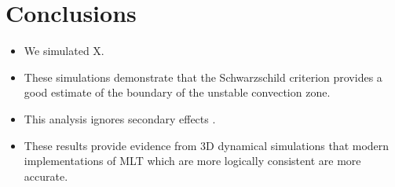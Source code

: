 \section{Conclusions}
\label{sec:conclusions}

\begin{itemize}
\item We simulated X.
\item These simulations demonstrate that the Schwarzschild criterion provides a good estimate of the boundary of the unstable convection zone.
\item This analysis ignores secondary effects \citep[e.g., convective penetration][because we designed our experiments to minimize these effects]{anders_etal_2022}.
\item These results provide evidence from 3D dynamical simulations that modern implementations of MLT \citep{mesa4, mesa5} which are more logically consistent \citep{gabriel_etal_2014} are more accurate.
\end{itemize}

